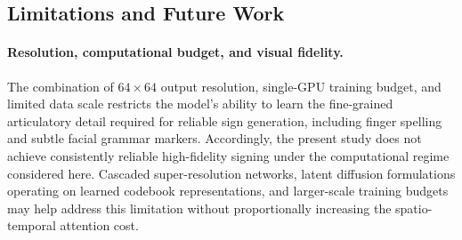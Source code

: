 \documentclass{ieeeaccess}
\begin{document}
{\begin{table}[t]
    \centering
    \caption{Conditioning-control analysis for the strongest checkpoint (8-step DDIM, CFG$=5.0$). Cross-prompt distance measures mean MSE between generations from different prompts; same-prompt distance measures mean MSE across repeated generations of the same prompt. These are coarse pixel-space probes rather than linguistic faithfulness metrics.}
    \label{tab:conditioning_controls}
    \renewcommand{\arraystretch}{1.12}
\end{table}

}
\subsection{Limitations and Future Work}

\paragraph{Resolution, computational budget, and visual fidelity.} The combination of $64 \times 64$ output resolution, single-GPU training budget, and limited data scale restricts the model's ability to learn the fine-grained articulatory detail required for reliable sign generation, including finger spelling and subtle facial grammar markers. Accordingly, the present study does not achieve consistently reliable high-fidelity signing under the computational regime considered here. Cascaded super-resolution networks, latent diffusion formulations operating on learned codebook representations, and larger-scale training budgets may help address this limitation without proportionally increasing the spatio-temporal attention cost.
\end{document}
